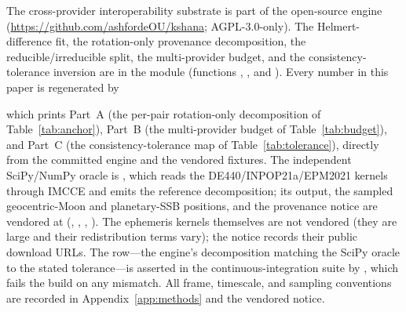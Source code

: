 \label{sec:availability}
The cross-provider interoperability substrate is part of the open-source
 engine \citep{baweja2026kshana}
(\url{https://github.com/ashfordeOU/kshana}; AGPL-3.0-only). The Helmert-difference
fit, the rotation-only provenance decomposition, the reducible/irreducible split, the
multi-provider budget, and the consistency-tolerance inversion are in the module
 (functions ,
, and ). Every number in this
paper is regenerated by
\begin{quote}
\end{quote}
which prints Part~A (the per-pair rotation-only decomposition of
Table~\ref{tab:anchor}), Part~B (the multi-provider budget of
Table~\ref{tab:budget}), and Part~C (the consistency-tolerance map of
Table~\ref{tab:tolerance}), directly from the committed engine and the vendored
fixtures. The independent SciPy/NumPy oracle is
, which reads the DE440/INPOP21a/EPM2021 kernels
through IMCCE  and emits the reference decomposition; its output, the
sampled geocentric-Moon and planetary-SSB positions, and the provenance notice are
vendored at  (,
, , ). The ephemeris
kernels themselves are not vendored (they are large and their redistribution terms
vary); the notice records their public download URLs. The \Validated{} row---the
engine's decomposition matching the SciPy oracle to the stated tolerance---is
asserted in the continuous-integration suite by
, which fails the build on any
mismatch. All frame, timescale, and sampling conventions are recorded in
Appendix~\ref{app:methods} and the vendored notice.

